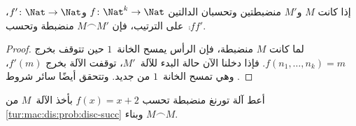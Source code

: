 \documentclass[../../../include/open-logic-section]{subfiles}
\begin{document}
\begin{prop}
    إذا كانت $M$ و$M'$ منضبطتين وتحسبان الدالتين $f\colon
    \Nat^k\to\Nat$ و$f'\colon\Nat\to\Nat$، على الترتيب، فإن
    $M\frown M'$ منضبطة وتحسب~$\comp{f}{f'}$.
\end{prop}

\begin{proof}
    لما كانت $M$ منضبطة، فإن الرأس يمسح الخانة~$1$ حين تتوقف بخرج
    $f(n_1,\dots,n_k)=m$. فإذا دخلنا الآن حالة البدء للآلة~$M'$،
    توقفت الآلة بخرج $f'(m)$، وهي تمسح الخانة~$1$ من جديد. وتتحقق
    أيضًا سائر شروط .
\end{proof}

\begin{prob}
    أعط آلة تورنغ منضبطة تحسب $f(x)=x+2$ بأخذ الآلة~$M$ من
    \cref{tur:mac:dis:prob:disc-succ} وبناء $M\frown M$.
\end{prob}
\end{document}
